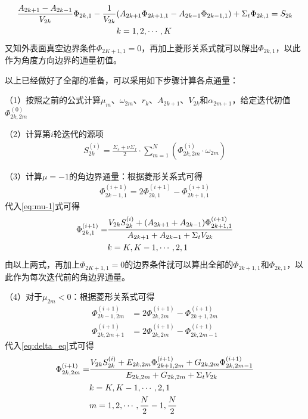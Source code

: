 \documentclass[a4paper,10.5pt]{article}
\begin{document}
\begin{align}
\frac{A_{2k+1}-A_{2k-1}}{V_{2k}}\Phi_{2k,1}-\frac{1}{V_{2k}}&(A_{2k+1}\Phi_{2k+1,1}-A_{2k-1}\Phi_{2k-1,1})+\Sigma_{t}\Phi_{2k,1}=S_{2k}\label{eq:mu-1}\\
&k=1,2,\cdots,K\notag
\end{align}
又知外表面真空边界条件$\Phi_{2K+1,1}=0$，再加上菱形关系式就可以解出$\Phi_{2k,1}$，以此作为角度方向边界的通量初值。\par
以上已经做好了全部的准备，可以采用如下步骤计算各点通量：\par
（1）按照之前的公式计算$\mu_{m}$、$\omega_{2m}$、$r_{k}$、$A_{2k+1}$、$V_{2k}$和$\alpha_{2m+1}$，给定迭代初值$\Phi_{2k,2m}^{(0)}$\par
（2）计算第$i$轮迭代的源项
\begin{align}
S_{2k}^{(i)}=\frac{\Sigma_{s}+\nu\Sigma_{f}}{2}\cdot\sum_{m=1}^{N}\left(\Phi_{2k,2m}^{(i)}\cdot\omega_{2m}\right)\label{eq:source}
\end{align}
\par
（3）计算$\mu=-1$的角边界通量：根据菱形关系式可得
\begin{align}
\Phi_{2k-1,1}^{(i+1)}=2\Phi_{2k,1}^{(i+1)}-\Phi_{2k+1,1}^{(i+1)}\label{eq:diamond-mu-1-iter}
\end{align}
代入\eqref{eq:mu-1}式可得
\begin{align}
\Phi_{2k,1}^{(i+1)}=&\frac{V_{2k}S_{2k}^{(i)}+(A_{2k+1}+A_{2k-1})\Phi_{2k+1,1}^{(i+1)}}{A_{2k+1}+A_{2k-1}+\Sigma_{t}V_{2k}}\label{eq:mu-1-iter}\\
&k=K,K-1,\cdots,2,1\notag
\end{align}
由以上两式，再加上$\Phi_{2K+1,1}=0$的边界条件就可以算出全部的$\Phi_{2k+1,1}$和$\Phi_{2k,1}$，以此作为每次迭代前的角边界通量。
\par
（4）对于$\mu_{2m}<0$：根据菱形关系式可得
\begin{align}
\Phi_{2k-1,2m}^{(i+1)}&=2\Phi_{2k,2m}^{(i+1)}-\Phi_{2k+1,2m}^{(i+1)}\label{eq:diamond-mu<0-iter-1}\\
\Phi_{2k,2m+1}^{(i+1)}&=2\Phi_{2k,2m}^{(i+1)}-\Phi_{2k,2m-1}^{(i+1)}\label{eq:diamond-mu<0-iter-2}
\end{align}
代入\eqref{eq:delta_eq}式可得
\begin{align}
\Phi_{2k,2m}^{(i+1)}=&\frac{V_{2k}S_{2k}^{(i)}+E_{2k,2m}\Phi_{2k+1,2m}^{(i+1)}+G_{2k,2m}\Phi_{2k,2m-1}^{(i+1)}}{E_{2k,2m}+G_{2k,2m}+\Sigma_{t}V_{2k}}\label{eq:mu<0-iter}\\
&k=K,K-1,\cdots,2,1\notag\\
&m=1,2,\cdots,\frac{N}{2}-1,\frac{N}{2}\notag
\end{align}
\end{document}
